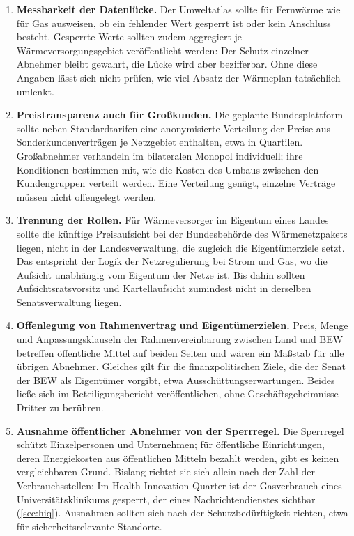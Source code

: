 \documentclass[11pt,DIV=13,a4paper,parskip=half,abstract=true,ngerman]{scrartcl}
\begin{document}
\begin{enumerate}[leftmargin=16pt]
    \item \textbf{Messbarkeit der Datenlücke.}
    Der Umweltatlas sollte für Fernwärme wie für Gas ausweisen, ob ein fehlender Wert gesperrt ist oder kein Anschluss besteht.
    Gesperrte Werte sollten zudem aggregiert je Wärmeversorgungsgebiet veröffentlicht werden: Der Schutz einzelner Abnehmer bleibt gewahrt, die Lücke wird aber bezifferbar.
    Ohne diese Angaben lässt sich nicht prüfen, wie viel Absatz der Wärmeplan tatsächlich umlenkt.

    \item \textbf{Preistransparenz auch für Großkunden.}
    Die geplante Bundesplattform sollte neben Standardtarifen eine anonymisierte Verteilung der Preise aus Sonderkundenverträgen je Netzgebiet enthalten, etwa in Quartilen.
    Großabnehmer verhandeln im bilateralen Monopol individuell; ihre Konditionen bestimmen mit, wie die Kosten des Umbaus zwischen den Kundengruppen verteilt werden.
    Eine Verteilung genügt, einzelne Verträge müssen nicht offengelegt werden.

    \item \textbf{Trennung der Rollen.}
    Für Wärmeversorger im Eigentum eines Landes sollte die künftige Preisaufsicht bei der Bundesbehörde des Wärmenetzpakets liegen, nicht in der Landesverwaltung, die zugleich die Eigentümerziele setzt.
    Das entspricht der Logik der Netzregulierung bei Strom und Gas, wo die Aufsicht unabhängig vom Eigentum der Netze ist.
    Bis dahin sollten Aufsichtsratsvorsitz und Kartellaufsicht zumindest nicht in derselben Senatsverwaltung liegen.

    \item \textbf{Offenlegung von Rahmenvertrag und Eigentümerzielen.}
    Preis, Menge und Anpassungsklauseln der Rahmenvereinbarung zwischen Land und BEW betreffen öffentliche Mittel auf beiden Seiten und wären ein Maßstab für alle übrigen Abnehmer.
    Gleiches gilt für die finanzpolitischen Ziele, die der Senat der BEW als Eigentümer vorgibt, etwa Ausschüttungserwartungen.
    Beides ließe sich im Beteiligungsbericht veröffentlichen, ohne Geschäftsgeheimnisse Dritter zu berühren.

    \item \textbf{Ausnahme öffentlicher Abnehmer von der Sperrregel.}
    Die Sperrregel schützt Einzelpersonen und Unternehmen; für öffentliche Einrichtungen, deren Energiekosten aus öffentlichen Mitteln bezahlt werden, gibt es keinen vergleichbaren Grund.
    Bislang richtet sie sich allein nach der Zahl der Verbrauchsstellen: Im Health Innovation Quarter ist der Gasverbrauch eines Universitätsklinikums gesperrt, der eines Nachrichtendienstes sichtbar (\autoref{sec:hiq}).
    Ausnahmen sollten sich nach der Schutzbedürftigkeit richten, etwa für sicherheitsrelevante Standorte.
\end{enumerate}
\end{document}
